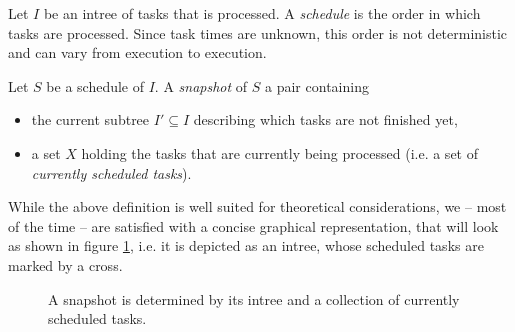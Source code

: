 \begin{definition}  
  Let $I$ be an intree of tasks that is processed. A \emph{schedule} is the order in which tasks are processed. Since task times are unknown, this order is not deterministic and can vary from execution to execution.

  Let $S$ be a schedule of $I$.
  A \emph{snapshot} of $S$ a pair containing
  \begin{itemize}
  \item the current subtree $I'\subseteq I$ describing which tasks are not finished yet,
  \item a set $X$ holding the tasks that are currently being processed (i.e. a set of \emph{currently scheduled tasks}).
  \end{itemize}
\end{definition}

While the above definition is well suited for theoretical considerations, we -- most of the time -- are satisfied with a concise graphical representation, that will look as shown in figure \ref{fig:intro-snapshot-graphical-representation}, i.e. it is depicted as an intree, whose scheduled tasks are marked by a cross.

\begin{figure}[t]
  \centering
  \caption{A snapshot is determined by its intree and a collection of currently scheduled tasks.}
  \label{fig:intro-snapshot-graphical-representation}
\end{figure}

